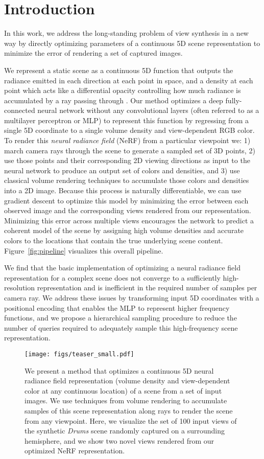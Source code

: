 \documentclass[runningheads]{llncs}
\newcommand{\scenename}[1]{\textit{#1}}
\begin{document}
\section{Introduction}

In this work, we address the long-standing problem of view synthesis in a new way by directly optimizing parameters of a continuous 5D scene representation to minimize the error of rendering a set of captured images. 

We represent a static scene as a continuous 5D function that outputs the radiance emitted in each direction  at each point  in space, and a density at each point which acts like a differential opacity controlling how much radiance is accumulated by a ray passing through .
Our method optimizes a deep fully-connected neural network without any convolutional layers (often referred to as a multilayer perceptron or MLP) to represent this function by regressing from a single 5D coordinate  to a single volume density and view-dependent RGB color. 
To render this \emph{neural radiance field} (NeRF) from a particular viewpoint we:
1) march camera rays through the scene to generate a sampled set of 3D points,
2) use those points and their corresponding 2D viewing directions as input to the neural network to produce an output set of colors and densities, and
3) use classical volume rendering techniques to accumulate those colors and densities into a 2D image.
Because this process is naturally differentiable, we can use gradient descent to optimize this model by minimizing the error between each observed image and the corresponding views rendered from our representation. Minimizing this error across multiple views encourages the network to predict a coherent model of the scene by assigning high volume densities and accurate colors to the locations that contain the true underlying scene content.
Figure~\ref{fig:pipeline} visualizes this overall pipeline.

We find that the basic implementation of optimizing a neural radiance field representation for a complex scene does not converge to a sufficiently high-resolution representation and is inefficient in the required number of samples per camera ray. We address these issues by transforming input 5D coordinates with a positional encoding that enables the MLP to represent higher frequency functions, and we propose a hierarchical sampling procedure to reduce the number of queries required to adequately sample this high-frequency scene representation.

\begin{figure}[t]
\centering
\texttt{[image: figs/teaser\_small.pdf]}
\caption{We present a method that optimizes a continuous 5D neural radiance field representation (volume density and view-dependent color at any continuous location) of a scene from a set of input images. We use techniques from volume rendering to accumulate samples of this scene representation along rays to render the scene from any viewpoint. Here, we visualize the set of 100 input views of the synthetic \scenename{Drums} scene randomly captured on a surrounding hemisphere, and we show two novel views rendered from our optimized NeRF representation.}
\label{fig:teaser}
\end{figure}
\end{document}
